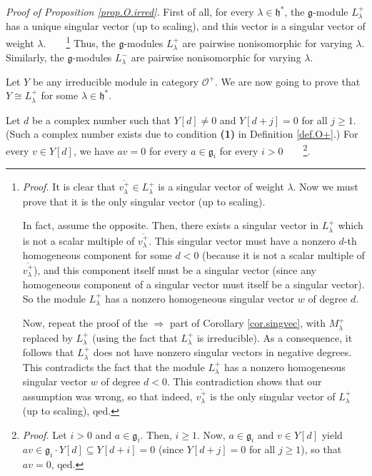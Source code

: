 \documentclass
[numbers=enddot,12pt,final,onecolumn,german,notitlepage]{scrartcl}%
\theoremstyle{definition}
\begin{document}
\textit{Proof of Proposition \ref{prop.O.irred}.} First of all, for every
$\lambda\in\mathfrak{h}^{\ast}$, the $\mathfrak{g}$-module $L_{\lambda}^{+}$
has a unique singular vector (up to scaling), and this vector is a singular
vector of weight $\lambda$.\ \ \ \ \footnote{\textit{Proof.} It is clear that
$\overline{v_{\lambda}^{+}}\in L_{\lambda}^{+}$ is a singular vector of weight
$\lambda$. Now we must prove that it is the only singular vector (up to
scaling).
\par
In fact, assume the opposite. Then, there exists a singular vector in
$L_{\lambda}^{+}$ which is not a scalar multiple of $\overline{v_{\lambda}%
^{+}}$. This singular vector must have a nonzero $d$-th homogeneous component
for some $d<0$ (because it is not a scalar multiple of $\overline{v_{\lambda
}^{+}}$), and this component itself must be a singular vector (since any
homogeneous component of a singular vector must itself be a singular vector).
So the module $L_{\lambda}^{+}$ has a nonzero homogeneous singular vector $w$
of degree $d$.
\par
Now, repeat the proof of the $\Longrightarrow$ part of Corollary
\ref{cor.singvec}, with $M_{\lambda}^{+}$ replaced by $L_{\lambda}^{+}$ (using
the fact that $L_{\lambda}^{+}$ is irreducible). As a consequence, it follows
that $L_{\lambda}^{+}$ does not have nonzero singular vectors in negative
degrees. This contradicts the fact that the module $L_{\lambda}^{+}$ has a
nonzero homogeneous singular vector $w$ of degree $d<0$. This contradiction
shows that our assumption was wrong, so that indeed, $\overline{v_{\lambda
}^{+}}$ is the only singular vector of $L_{\lambda}^{+}$ (up to scaling),
qed.} Thus, the $\mathfrak{g}$-modules $L_{\lambda}^{+}$ are pairwise
nonisomorphic for varying $\lambda$. Similarly, the $\mathfrak{g}$-modules
$L_{\lambda}^{-}$ are pairwise nonisomorphic for varying $\lambda$.

Let $Y$ be any irreducible module in category $\mathcal{O}^{+}$. We are now
going to prove that $Y\cong L_{\lambda}^{+}$ for some $\lambda\in
\mathfrak{h}^{\ast}$.

Let $d$ be a complex number such that $Y\left[  d\right]  \neq0$ and $Y\left[
d+j\right]  =0$ for all $j\geq1$. (Such a complex number exists due to
condition \textbf{(1)} in Definition \ref{def.O+}.) For every $v\in Y\left[
d\right]  $, we have $av=0$ for every $a\in\mathfrak{g}_{i}$ for every
$i>0$\ \ \ \ \footnote{\textit{Proof.} Let $i>0$ and $a\in\mathfrak{g}_{i}$.
Then, $i\geq1$. Now, $a\in\mathfrak{g}_{i}$ and $v\in Y\left[  d\right]  $
yield $av\in\mathfrak{g}_{i}\cdot Y\left[  d\right]  \subseteq Y\left[
d+i\right]  =0$ (since $Y\left[  d+j\right]  =0$ for all $j\geq1$), so that
$av=0$, qed.}.
\end{document}
